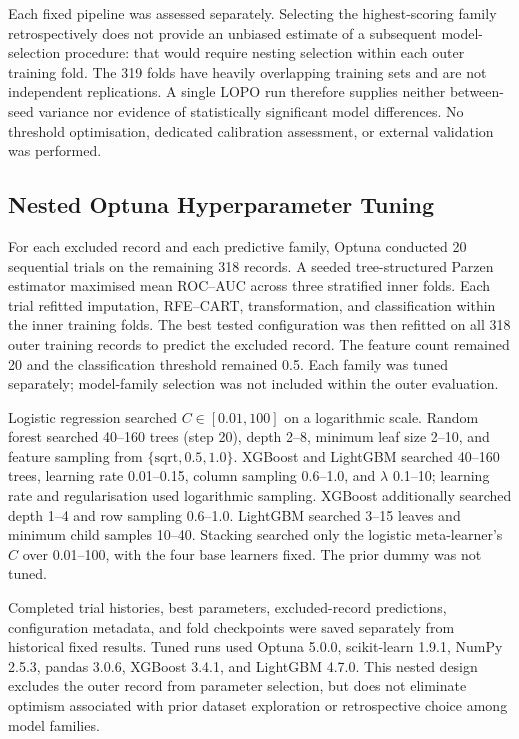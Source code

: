 Each fixed pipeline was assessed separately. Selecting the highest-scoring family retrospectively does not provide an unbiased estimate of a subsequent model-selection procedure: that would require nesting selection within each outer training fold. The 319 folds have heavily overlapping training sets and are not independent replications. A single LOPO run therefore supplies neither between-seed variance nor evidence of statistically significant model differences. No threshold optimisation, dedicated calibration assessment, or external validation was performed.

\subsection{Nested Optuna Hyperparameter Tuning}
For each excluded record and each predictive family, Optuna conducted 20 sequential trials on the remaining 318 records. A seeded tree-structured Parzen estimator maximised mean ROC--AUC across three stratified inner folds. Each trial refitted imputation, RFE--CART, transformation, and classification within the inner training folds. The best tested configuration was then refitted on all 318 outer training records to predict the excluded record. The feature count remained 20 and the classification threshold remained 0.5. Each family was tuned separately; model-family selection was not included within the outer evaluation.

Logistic regression searched $C\in[0.01,100]$ on a logarithmic scale. Random forest searched 40--160 trees (step 20), depth 2--8, minimum leaf size 2--10, and feature sampling from $\{\text{sqrt},0.5,1.0\}$. XGBoost and LightGBM searched 40--160 trees, learning rate 0.01--0.15, column sampling 0.6--1.0, and $\lambda$ 0.1--10; learning rate and regularisation used logarithmic sampling. XGBoost additionally searched depth 1--4 and row sampling 0.6--1.0. LightGBM searched 3--15 leaves and minimum child samples 10--40. Stacking searched only the logistic meta-learner's $C$ over 0.01--100, with the four base learners fixed. The prior dummy was not tuned.

Completed trial histories, best parameters, excluded-record predictions, configuration metadata, and fold checkpoints were saved separately from historical fixed results. Tuned runs used Optuna 5.0.0, scikit-learn 1.9.1, NumPy 2.5.3, pandas 3.0.6, XGBoost 3.4.1, and LightGBM 4.7.0. This nested design excludes the outer record from parameter selection, but does not eliminate optimism associated with prior dataset exploration or retrospective choice among model families.

